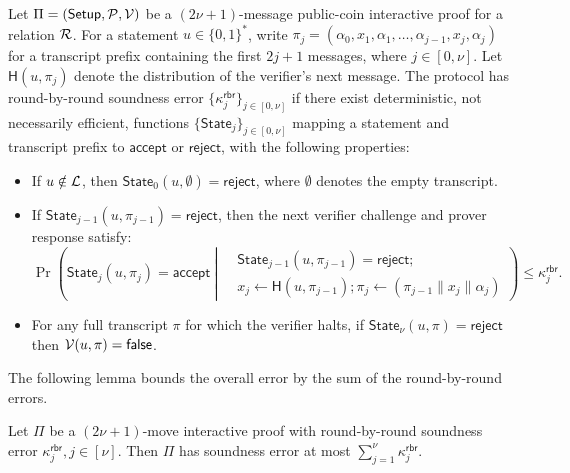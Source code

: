 \begin{definition}
	\label{def:roundByRoundSoundness}
	Let $\Pi=({\sf Setup},\mathcal{P},\mathcal{V})$ be a $(2\nu+1)$-message
    public-coin interactive proof for a relation $\mathcal{R}$.
    For a statement $u\in\{0,1\}^*$, write
    $\pi_j=(\alpha_0,x_1,\alpha_1,\ldots,\alpha_{j-1},x_j,\alpha_j)$
    for a transcript prefix containing the first $2j+1$ messages,
    where $j\in[0,\nu]$. Let $\mathsf H(u,\pi_j)$ denote the
    distribution of the verifier's next message.
    The protocol has round-by-round soundness error
    $\{\kappa_j^\mathsf{rbr}\}_{j\in[0,\nu]}$ if there exist
    deterministic, not necessarily efficient, functions
    $\{\mathsf{State}_j\}_{j\in[0,\nu]}$ mapping a statement and
    transcript prefix to $\mathsf{accept}$ or $\mathsf{reject}$,
    with the following properties:
		\begin{itemize}
			\item If $u \notin \mathcal{L}$, then $\mathsf{State}_0(u, \emptyset) = \mathsf{reject}$, where $\emptyset$ denotes the empty transcript.
			\item If $\mathsf{State}_{j-1}(u,\pi_{j-1})=\mathsf{reject}$,
            then the next verifier challenge and prover response satisfy:
			\[
				\Pr\!\!
				\left(
					\mathsf{State}_j(u, \pi_j) = \mathsf{accept~}\!\!
					\left|~\!
						\begin{aligned}
							&\!\mathsf{State}_{j - 1}(u, \pi_{j - 1}) = \mathsf{reject}; \\
							& x_j \leftarrow \mathsf{H}(u, \pi_{j - 1}); \pi_j \leftarrow (\pi_{j - 1} \| x_j \| \alpha_j)\!
						\!\end{aligned}
					\right.
				\right)\!
				\!\le\!\kappa_j^\mathsf{rbr}.
			\]
			\item For any full transcript $\pi$ for which the verifier halts, if $\mathsf{State}_\nu(u, \pi) = \mathsf{reject}$ then $\mathcal{V}(u, \pi) = {\sf false}$.
		\end{itemize}
\end{definition}

The following lemma bounds the overall error by the sum of the
round-by-round errors.
\begin{lemma}
\label{lemma:rbr}
	Let $\Pi$ be a $(2 \nu + 1)$-move interactive proof with round-by-round soundness error $\kappa_j^\mathsf{rbr}, j \in [\nu]$.
	Then $\Pi$ has soundness error at most
    $\sum_{j=1}^\nu\kappa_j^\mathsf{rbr}$.
\end{lemma}
